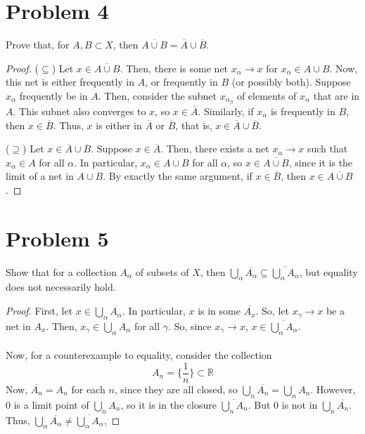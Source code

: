 \documentclass[fontsize=11pt]{scrartcl} %
\numberwithin{equation}{section} %
\numberwithin{figure}{section} %
\numberwithin{table}{section} %
\begin{document}
\section*{Problem 4}
Prove that, for $A,B\subset X$, then $\overline{A\cup B} = \overline{A}\cup\overline{B}$.
\\
\begin{proof}
($\subseteq$)
Let $x\in \overline{A\cup B}$. Then, there is some net $x_{\alpha}\to x$ for $x_{\alpha}\in A\cup B$.
Now, this net is either frequently in $A$, or frequently in $B$ (or possibly both). Suppose
 $x_{\alpha}$ frequently be in $A$. Then, consider the subnet $x_{\alpha_{\beta}}$
of elements of $x_{\alpha}$ that are in $A$. This subnet also converges to $x$, so $x\in\overline{A}$.
Similarly, if $x_{\alpha}$ is frequently in $B$, then $x\in\overline{B}$. Thus, $x$ is either
in $\overline{A}$ or $\overline{B}$, that is, $x\in\overline{A}\cup\overline{B}$.

($\supseteq$)
Let $x\in\overline{A}\cup\overline{B}$. Suppose $x\in\overline{A}$. Then, there exists a net
$x_{\alpha}\to x$ such that $x_{\alpha}\in A$ for all $\alpha$. In particular, $x_{\alpha}\in A\cup B$
for all $\alpha$, so $x\in\overline{A\cup B}$, since it is the limit of a net in $A\cup B$. 
By exactly the same argument, if $x\in\overline{B}$, then $x\in\overline{A\cup B}$.
\end{proof}


\section*{Problem 5}
Show that for a collection $A_{\alpha}$ of subsets of $X$, then 
$\bigcup_{\alpha}\overline{A_{\alpha}}\subseteq\overline{\bigcup_{\alpha}A_{\alpha}}$,
but equality does not necessarily hold.
\\
\begin{proof}
First, let $x\in\bigcup_{\alpha}\overline{A_{\alpha}}$. In particular, $x$ is in some $\overline{A_{x}}$.
So, let $x_{\gamma}\to x$ be a net in $A_x$. Then, $x_{\gamma}\in \bigcup_{\alpha}A_{\alpha}$ for all $\gamma$. So,
since $x_{\gamma}\to x$, $x\in\overline{\bigcup_{\alpha}A_{\alpha}}$.
\\
\\
Now, for a counterexample to equality, consider the collection
\[
A_n = \{\frac{1}{n}\} \subset \mathbb{R}
\]
Now, $\overline{A_n} = A_n$ for each $n$, since they are all closed, so $\bigcup_n \overline{A_n} = \bigcup_n A_n$.
However, $0$ is a limit point of $\bigcup_n A_n$, so it is in the closure $\overline{\bigcup_n A_n}$. But $0$
is not in $\bigcup_n \overline{A_n}$. Thus, 
$\bigcup_{\alpha}\overline{A_{\alpha}}\neq\overline{\bigcup_{\alpha}A_{\alpha}}$,

\end{proof}
\end{document}
